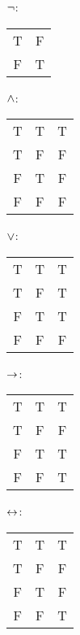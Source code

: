 \begin{center}
			\begin{minipage}{.25\textwidth}$\neg$:\,
				\begin{tabular}{c@{ $\leadsto$ }c}
				T&F\\
				F&T
				\end{tabular}
			\end{minipage}
			\begin{minipage}{.35\textwidth}$\mathbin{\wedge}$:\,
				\begin{tabular}{c@{, }c@{ $\leadsto$ }c}
				T&T&T\\
				T&F&F\\
				F&T&F\\
				F&F&F
				\end{tabular}
			\end{minipage}
			\begin{minipage}{.35\textwidth}$\vee$:\,
				\begin{tabular}{c@{, }c@{ $\leadsto$ }c}
				T&T&T\\
				T&F&T\\
				F&T&T\\
				F&F&F
				\end{tabular}
			\end{minipage}
			
			\medskip 
			\begin{minipage}{.35\textwidth}$\rightarrow$:\,
				\begin{tabular}{c@{, }c@{ $\leadsto$ }c}
				T&T&T\\
				T&F&F\\
				F&T&T\\
				F&F&T
				\end{tabular}
			\end{minipage}
			\begin{minipage}{.35\textwidth}$\leftrightarrow$:\,
				\begin{tabular}{c@{, }c@{ $\leadsto$ }c}
				T&T&T\\
				T&F&F\\
				F&T&F\\
				F&F&T
				\end{tabular}
			\end{minipage}
	\end{center}



